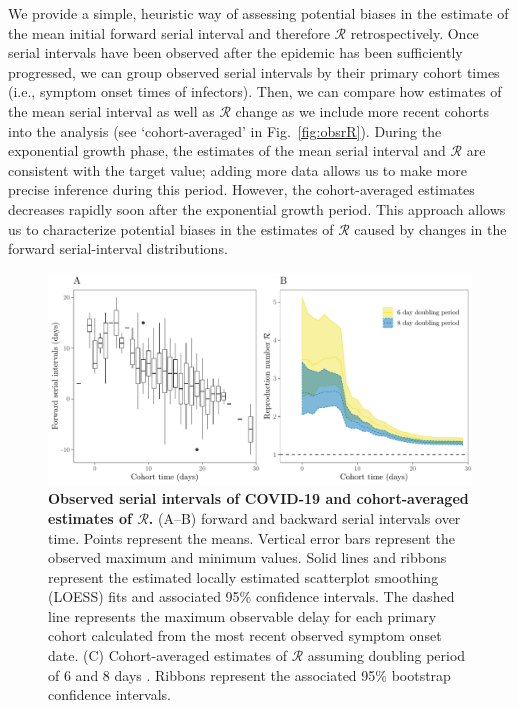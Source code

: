 \documentclass[12pt]{article}
\newcommand{\fref}[1]{Fig.~\ref{fig:#1}}
\newcommand{\RR}{\ensuremath{{\mathcal R}}\xspace}
\begin{document}
We provide a simple, heuristic way of assessing potential biases in the estimate of the mean initial forward serial interval and therefore \RR retrospectively.
Once serial intervals have been observed after the epidemic has been sufficiently progressed, we can group observed serial intervals by their primary cohort times (i.e., symptom onset times of infectors).
Then, we can compare how estimates of the mean serial interval as well as \RR change as we include more recent cohorts into the analysis (see `cohort-averaged' in \fref{obsrR}).
During the exponential growth phase, the estimates of the mean serial interval and \RR are consistent with the target value;
adding more data allows us to make more precise inference during this period.
However, the cohort-averaged estimates decreases rapidly soon after the exponential growth period.
This approach allows us to characterize potential biases in the estimates of \RR caused by changes in the forward serial-interval distributions.

\begin{figure}[!th]
\includegraphics[width=\textwidth]{serial_analysis.pdf}
\caption{
\textbf{Observed serial intervals of COVID-19 and cohort-averaged estimates of \RR.}
(A--B) forward and backward serial intervals over time.
Points represent the means. Vertical error bars represent the observed maximum and minimum values.
Solid lines and ribbons represent the estimated locally estimated scatterplot smoothing (LOESS) fits and associated 95\% confidence intervals.
The dashed line represents the maximum observable delay for each primary cohort calculated from the most recent observed symptom onset date.
(C) Cohort-averaged estimates of \RR assuming doubling period of 6 and 8 days \citep{li2020early, wu2020nowcasting}.
Ribbons represent the associated 95\% bootstrap confidence intervals.
}
\label{fig:du}
\end{figure}
\end{document}
